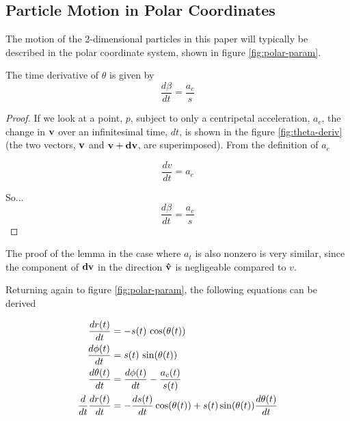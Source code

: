 
\subsection{Particle Motion in Polar Coordinates}

The motion of the 2-dimensional particles in this paper will typically be described in the polar coordinate system, shown in figure \ref{fig:polar-param}.


\begin{lemma}
The time derivative of $\theta$ is given by
\[
\frac{d\beta}{dt} = \frac{a_c}{s}
\]
\end{lemma}

\begin{proof}


If we look at a point, $p$, subject to only a centripetal acceleration, $a_c$, the change in $\mathbf{v}$ over an infinitesimal time, $dt$, is shown in the figure \ref{fig:theta-deriv} (the two vectors, $\mathbf{v}$ and $\mathbf{v}+\mathbf{dv}$, are superimposed). From the definition of $a_c$

\[
\frac{dv}{dt} = a_c
\]

So...
\[
\frac{d\beta}{dt} = \frac{a_c}{s}
\]
\end{proof}

The proof of the lemma in the case where $a_t$ is also nonzero is very similar, since the component of $\mathbf{dv}$ in the direction $\mathbf{\hat{v}}$ is negligeable compared to $v$.

Returning again to figure \ref{fig:polar-param}, the following equations can be derived

\begin{align}
  \frac{dr(t)}{dt}& = -s(t) \, \cos\paren{\theta(t)}\\
  \frac{d\phi(t)}{dt}& = s(t) \, \sin\paren{\theta(t)}\\
  \frac{d\theta(t)}{dt}& = \frac{d\phi(t)}{dt} - \frac{a_c(t)}{s(t)}\label{eq:theta-deriv}\\
  \frac{d}{dt} \frac{dr(t)}{dt}& = -\frac{ds(t)}{dt} \cos\paren{\theta(t)} + s(t) \sin\paren{\theta(t)} \frac{d\theta(t)}{dt}
\end{align}

